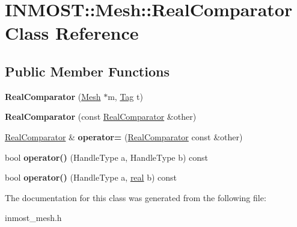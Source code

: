 \hypertarget{classINMOST_1_1Mesh_1_1RealComparator}{\section{I\-N\-M\-O\-S\-T\-:\-:Mesh\-:\-:Real\-Comparator Class Reference}
\label{classINMOST_1_1Mesh_1_1RealComparator}
}
\subsection*{Public Member Functions}
\begin{DoxyCompactItemize}
\item 
\hypertarget{classINMOST_1_1Mesh_1_1RealComparator_a854647836574291c45c1b5437db5a858}{{\bfseries Real\-Comparator} (\hyperlink{classINMOST_1_1Mesh}{Mesh} $\ast$m, \hyperlink{classINMOST_1_1Tag}{Tag} t)}\label{classINMOST_1_1Mesh_1_1RealComparator_a854647836574291c45c1b5437db5a858}

\item 
\hypertarget{classINMOST_1_1Mesh_1_1RealComparator_a76f5246111a601d18b9bdaf70a03161a}{{\bfseries Real\-Comparator} (const \hyperlink{classINMOST_1_1Mesh_1_1RealComparator}{Real\-Comparator} \&other)}\label{classINMOST_1_1Mesh_1_1RealComparator_a76f5246111a601d18b9bdaf70a03161a}

\item 
\hypertarget{classINMOST_1_1Mesh_1_1RealComparator_aef14b68a467c5a4a8a3270032eb93e33}{\hyperlink{classINMOST_1_1Mesh_1_1RealComparator}{Real\-Comparator} \& {\bfseries operator=} (\hyperlink{classINMOST_1_1Mesh_1_1RealComparator}{Real\-Comparator} const \&other)}\label{classINMOST_1_1Mesh_1_1RealComparator_aef14b68a467c5a4a8a3270032eb93e33}

\item 
\hypertarget{classINMOST_1_1Mesh_1_1RealComparator_af394d903edeb659bd1a48a95b569996c}{bool {\bfseries operator()} (Handle\-Type a, Handle\-Type b) const }\label{classINMOST_1_1Mesh_1_1RealComparator_af394d903edeb659bd1a48a95b569996c}

\item 
\hypertarget{classINMOST_1_1Mesh_1_1RealComparator_a2a74e2d409fc1bec93ada37017b8d2f8}{bool {\bfseries operator()} (Handle\-Type a, \hyperlink{classINMOST_1_1Storage_a853346784b4a5822a7fac54d8f10f805}{real} b) const }\label{classINMOST_1_1Mesh_1_1RealComparator_a2a74e2d409fc1bec93ada37017b8d2f8}

\end{DoxyCompactItemize}


The documentation for this class was generated from the following file\-:\begin{DoxyCompactItemize}
\item 
inmost\-\_\-mesh.\-h\end{DoxyCompactItemize}
